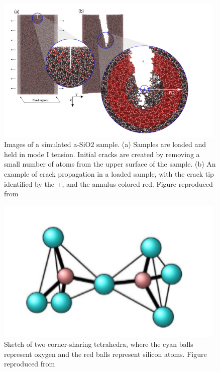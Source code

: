 \begin{figure}[!b]
  \centering
  \includegraphics[width=11cm]{picture/FractureMechanism.PNG}
  \caption{Images of a simulated a-SiO2 sample. (a) Samples are loaded and held in mode I tension. Initial cracks are created by removing a
small number of atoms from the upper surface of the sample. (b) An example of crack propagation in a loaded sample, with the crack tip
identified by the +, and the annulus colored red. Figure reproduced from~\protect\cite{mWilson_continuum_stress}} 
  \label{crack_prop}
\end{figure}


\begin{figure}[!b]
  \centering
  \includegraphics[width=11cm]{picture/tetrahedra.PNG}
  \caption{Sketch of two corner-sharing tetrahedra, where the cyan balls represent oxygen
and the red balls represent silicon atoms.
Figure reproduced from~\protect\cite{ebrahem2018influence}} 
  \label{tetrahedra}
\end{figure}




